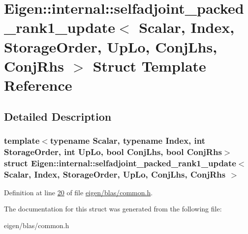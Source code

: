 \hypertarget{struct_eigen_1_1internal_1_1selfadjoint__packed__rank1__update}{}\section{Eigen\+:\+:internal\+:\+:selfadjoint\+\_\+packed\+\_\+rank1\+\_\+update$<$ Scalar, Index, Storage\+Order, Up\+Lo, Conj\+Lhs, Conj\+Rhs $>$ Struct Template Reference}
\label{struct_eigen_1_1internal_1_1selfadjoint__packed__rank1__update}


\subsection{Detailed Description}
\subsubsection*{template$<$typename Scalar, typename Index, int Storage\+Order, int Up\+Lo, bool Conj\+Lhs, bool Conj\+Rhs$>$\newline
struct Eigen\+::internal\+::selfadjoint\+\_\+packed\+\_\+rank1\+\_\+update$<$ Scalar, Index, Storage\+Order, Up\+Lo, Conj\+Lhs, Conj\+Rhs $>$}



Definition at line \hyperlink{eigen_2blas_2common_8h_source_l00020}{20} of file \hyperlink{eigen_2blas_2common_8h_source}{eigen/blas/common.\+h}.



The documentation for this struct was generated from the following file\+:\begin{DoxyCompactItemize}
\item 
eigen/blas/common.\+h\end{DoxyCompactItemize}
